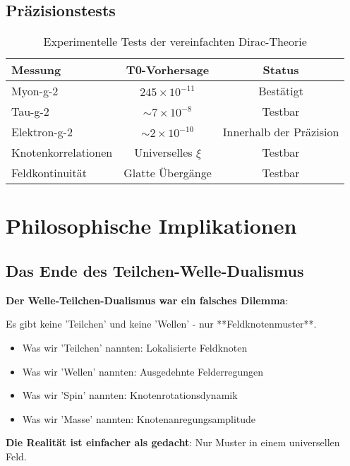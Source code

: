 \documentclass[12pt,a4paper]{article}
\newcommand{\xipar}{\xi}
\theoremstyle{definition}
\theoremstyle{remark}
\begin{document}
	\subsection{Präzisionstests}
	
	\begin{table}[htbp]
		\centering
		\begin{tabular}{lcc}
			\toprule
			\textbf{Messung} & \textbf{T0-Vorhersage} & \textbf{Status} \\
			\midrule
			Myon-g-2 & $245 \times 10^{-11}$ & \checkmark Bestätigt \\
			Tau-g-2 & $\sim 7 \times 10^{-8}$ & Testbar \\
			Elektron-g-2 & $\sim 2 \times 10^{-10}$ & Innerhalb der Präzision \\
			Knotenkorrelationen & Universelles $\xipar$ & Testbar \\
			Feldkontinuität & Glatte Übergänge & Testbar \\
			\bottomrule
		\end{tabular}
		\caption{Experimentelle Tests der vereinfachten Dirac-Theorie}
		\label{tab:experimental_tests}
	\end{table}
	

	\section{Philosophische Implikationen}
	
	\subsection{Das Ende des Teilchen-Welle-Dualismus}
	
	\begin{tcolorbox}[colback=purple!5!white,colframe=purple!75!black,title=Philosophische Revolution]
		\textbf{Der Welle-Teilchen-Dualismus war ein falsches Dilemma}:
		
		Es gibt keine 'Teilchen' und keine 'Wellen' - nur **Feldknotenmuster**.
		
		\begin{itemize}
			\item Was wir 'Teilchen' nannten: Lokalisierte Feldknoten
			\item Was wir 'Wellen' nannten: Ausgedehnte Felderregungen  
			\item Was wir 'Spin' nannten: Knotenrotationsdynamik
			\item Was wir 'Masse' nannten: Knotenanregungsamplitude
		\end{itemize}
		
		\textbf{Die Realität ist einfacher als gedacht}: Nur Muster in einem universellen Feld.
	\end{tcolorbox}
	
\end{document}
